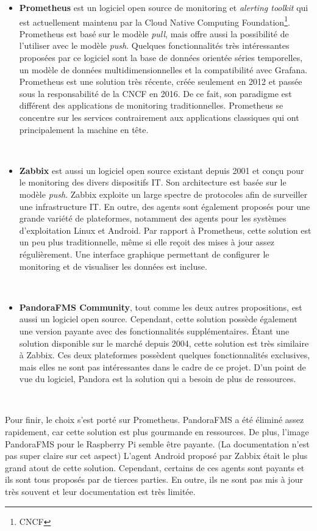 \begin{itemize}
  \item \textbf{Prometheus} est un logiciel open source de monitoring et \textit{alerting toolkit} qui est actuellement maintenu par la Cloud Native Computing Foundation\footnote{CNCF}. Prometheus est basé sur le modèle \textit{pull}, mais offre aussi la possibilité de l’utiliser avec le modèle \textit{push}. Quelques fonctionnalités très intéressantes proposées par ce logiciel sont la base de données orientée séries temporelles, un modèle de données multidimensionnelles et la compatibilité avec Grafana. Prometheus est une solution très récente, créée seulement en 2012 et passée sous la responsabilité de la CNCF en 2016. De ce fait, son paradigme est différent des applications de monitoring traditionnelles. Prometheus se concentre sur les services \cite{prometheus_paradigm} contrairement aux applications classiques qui ont principalement la machine en tête.

  ~

  \item \textbf{Zabbix} est aussi un logiciel open source existant depuis 2001 et conçu pour le monitoring des divers dispositifs IT. Son architecture est basée sur le modèle \textit{push}. Zabbix exploite un large spectre de protocoles afin de surveiller une infrastructure IT. En outre, des agents sont également proposés pour une grande variété de plateformes, notamment des agents pour les systèmes d’exploitation Linux et Android. Par rapport à Prometheus, cette solution est un peu plus traditionnelle, même si elle reçoit des mises à jour assez régulièrement. Une interface graphique permettant de configurer le monitoring et de visualiser les données est incluse.

  ~

  \item \textbf{PandoraFMS Community}, tout comme les deux autres propositions, est aussi un logiciel open source. Cependant, cette solution possède également une version payante avec des fonctionnalités supplémentaires. Étant une solution disponible sur le marché depuis 2004, cette solution est très similaire à Zabbix. Ces deux plateformes possèdent quelques fonctionnalités exclusives, mais elles ne sont pas intéressantes dans le cadre de ce projet. D’un point de vue du logiciel, Pandora est la solution qui a besoin de plus de ressources.
\end{itemize}


~

\noindent
Pour finir, le choix s’est porté sur Prometheus. PandoraFMS a été éliminé assez rapidement, car cette solution est plus gourmande en ressources. De plus, l’image PandoraFMS pour le Raspberry Pi semble être payante. (La documentation n’est pas super claire sur cet aspect) L’agent Android proposé par Zabbix était le plus grand atout de cette solution. Cependant, certains de ces agents sont payants et ils sont tous proposés par de tierces parties. En outre, ils ne sont pas mis à jour très souvent et leur documentation est très limitée.

